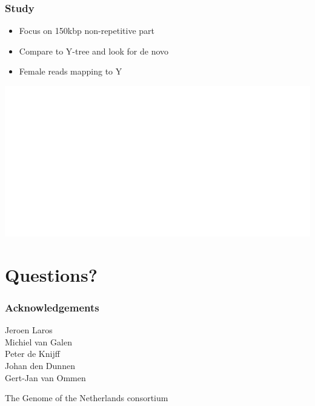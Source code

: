 \documentclass[slidestop,14pt]{beamer}
\begin{document}
\begin{frame}
  \frametitle{Study}

  \vspace{0.5\baselineskip}

  \begin{itemize}
    \item Focus on 150kbp non-repetitive part
    \item Compare to Y-tree and look for de novo
    \item Female reads mapping to Y
 \end{itemize}


  \begin{center}
    \includegraphics[width=0.8\linewidth,transparent]{yhaplogroups.png}
  \end{center}

\end{frame}

\section{Questions?}


\lastpagetemplate
\begin{frame}
  \frametitle{Acknowledgements}

  \vspace{\baselineskip}

  Jeroen Laros\\
  Michiel van Galen\\
  Peter de Knijff\\
  Johan den Dunnen\\
  Gert-Jan van Ommen

  \vspace{\baselineskip}

  The Genome of the Netherlands consortium
\end{frame}
\end{document}
